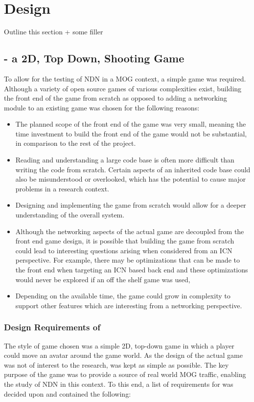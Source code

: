\chapter{Design}
Outline this section + some filler


\section{\game{} - a 2D, Top Down, Shooting Game}
To allow for the testing of NDN in a MOG context, a simple game was required. Although a variety of open source games of various complexities exist, building the front end of the game from scratch as opposed to adding a networking module to an existing game was chosen for the following reasons:

\begin{itemize}
    \item The planned scope of the front end of the game was very small, meaning the time investment to build the front end of the game would not be substantial, in comparison to the rest of the project.
    \item Reading and understanding a large code base is often more difficult than writing the code from scratch. Certain aspects of an inherited code base could also be misunderstood or overlooked, which has the potential to cause major problems in a research context.
    \item Designing and implementing the game from scratch would allow for a deeper understanding of the overall system.
    \item Although the networking aspects of the actual game are decoupled from the front end game design, it is possible that building the game from scratch could lead to interesting questions arising when considered from an ICN perspective. For example, there may be optimizations that can be made to the front end when targeting an ICN based back end and these optimizations would never be explored if an off the shelf game was used,
    \item Depending on the available time, the game could grow in complexity to support other features which are interesting from a networking perspective.
\end{itemize}

\subsection{Design Requirements of \game{}}
The style of game chosen was a simple 2D, top-down game in which a player could move an avatar around the game world. As the design of the actual game was not of interest to the research, \game{} was kept as simple as possible. The key purpose of the game was to provide a source of real world MOG traffic, enabling the study of NDN in this context. To this end, a list of requirements for \game{} was decided upon and contained the following:

